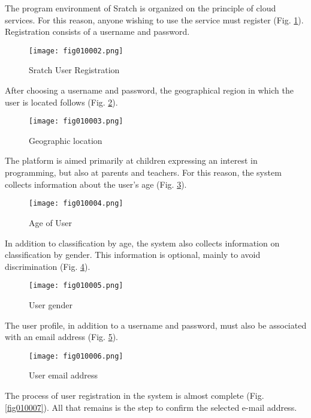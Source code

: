 The program environment of Sratch is organized on the principle of cloud services. For this reason, anyone wishing to use the service must register (Fig. \ref{fig010002}). Registration consists of a username and password.

\begin{figure}[H]
   \centering
   \texttt{[image: fig010002.png]}
   \caption{Sratch User Registration}
\label{fig010002}
\end{figure}

After choosing a username and password, the geographical region in which the user is located follows (Fig. \ref{fig010003}).

\begin{figure}[H]
   \centering
   \texttt{[image: fig010003.png]}
   \caption{Geographic location}
\label{fig010003}
\end{figure}

The platform is aimed primarily at children expressing an interest in programming, but also at parents and teachers. For this reason, the system collects information about the user's age (Fig. \ref{fig010004}).

\begin{figure}[H]
   \centering
   \texttt{[image: fig010004.png]}
   \caption{Age of User}
\label{fig010004}
\end{figure}

In addition to classification by age, the system also collects information on classification by gender. This information is optional, mainly to avoid discrimination (Fig. \ref{fig010005}).

\begin{figure}[H]
   \centering
   \texttt{[image: fig010005.png]}
   \caption{User gender}
\label{fig010005}
\end{figure}

The user profile, in addition to a username and password, must also be associated with an email address (Fig. \ref{fig010006}).

\begin{figure}[H]
   \centering
   \texttt{[image: fig010006.png]}
   \caption{User email address}
\label{fig010006}
\end{figure}

The process of user registration in the system is almost complete (Fig. \ref{fig010007}). All that remains is the step to confirm the selected e-mail address.

